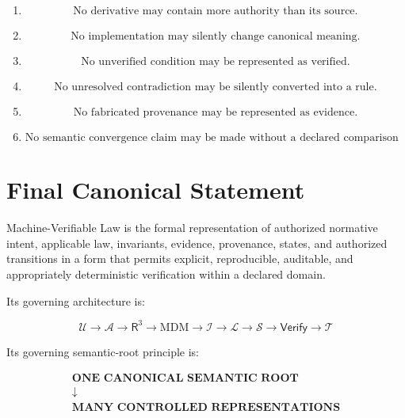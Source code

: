 \documentclass[11pt]{article}
\newcommand{\Rthree}{\ensuremath{\mathsf{R}^{3}}}
\newcommand{\MDM}{\ensuremath{\mathrm{MDM}}}
\newcommand{\Purpose}{\mathcal{U}}
\newcommand{\Authority}{\mathcal{A}}
\newcommand{\Inv}{\mathcal{I}}
\newcommand{\State}{\mathcal{S}}
\newcommand{\Law}{\mathcal{L}}
\newcommand{\Truth}{\mathcal{T}}
\newcommand{\Verify}{\mathsf{Verify}}
\begin{document}
\begin{enumerate}
    \item
    \[
    \boxed{
    \text{No derivative may contain more authority than its source.}
    }
    \]

    \item
    \[
    \boxed{
    \text{No implementation may silently change canonical meaning.}
    }
    \]

    \item
    \[
    \boxed{
    \text{No unverified condition may be represented as verified.}
    }
    \]

    \item
    \[
    \boxed{
    \text{No unresolved contradiction may be silently converted into a rule.}
    }
    \]

    \item
    \[
    \boxed{
    \text{No fabricated provenance may be represented as evidence.}
    }
    \]

    \item
    \[
    \boxed{
    \text{No semantic convergence claim may be made without a declared comparison relation.}
    }
    \]
\end{enumerate}

\section{Final Canonical Statement}

Machine-Verifiable Law is the formal representation of
authorized normative intent, applicable law, invariants,
evidence, provenance, states, and authorized transitions in a
form that permits explicit, reproducible, auditable, and
appropriately deterministic verification within a declared
domain.

Its governing architecture is:

\[
\boxed{
\Purpose
\rightarrow
\Authority
\rightarrow
\Rthree{}
\rightarrow
\MDM
\rightarrow
\Inv
\rightarrow
\Law
\rightarrow
\State
\rightarrow
\Verify
\rightarrow
\Truth
}
\]

Its governing semantic-root principle is:

\[
\boxed{
\begin{gathered}
\textbf{ONE CANONICAL SEMANTIC ROOT}\\
\downarrow\\
\textbf{MANY CONTROLLED REPRESENTATIONS}
\end{gathered}
}
\]
\end{document}
